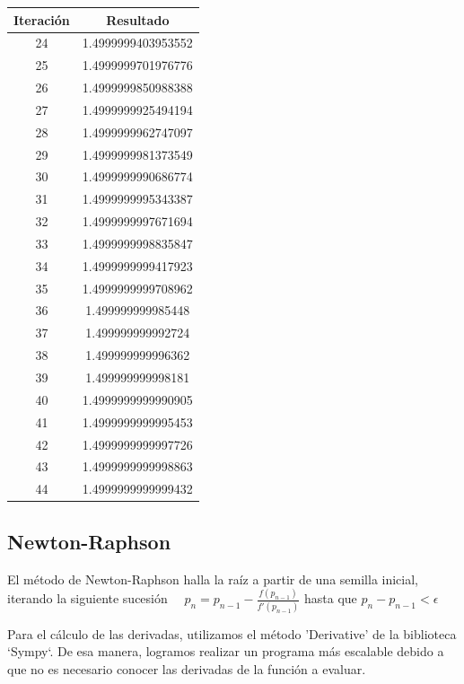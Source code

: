 \documentclass[titlepage,a4paper]{article}
\begin{document}
\begin{multicols}{2}
\begin{center}
\begin{tabular}{| c | c |}
           \hline
    \end{tabular}
\end{center}
        \begin{center}
    \begin{tabular}{| c | c |}
    \hline
     Iteración & Resultado \\ \hline
   24     &  1.4999999403953552 \\
25     &  1.4999999701976776 \\
26     &  1.4999999850988388 \\
27     &  1.4999999925494194 \\
28     &  1.4999999962747097 \\
29     &  1.4999999981373549 \\
30     &  1.4999999990686774 \\
31     &  1.4999999995343387 \\
32     &  1.4999999997671694 \\
33     &  1.4999999998835847 \\
34     &  1.4999999999417923 \\
35     &  1.4999999999708962 \\
36     &  1.499999999985448 \\
37     &  1.499999999992724 \\
38     &  1.499999999996362 \\
39     &  1.499999999998181 \\
40     &  1.4999999999990905 \\
41     &  1.4999999999995453 \\
42     &  1.4999999999997726 \\
43     &  1.4999999999998863 \\
44     &  1.4999999999999432 \\
    \hline
    \end{tabular}
\end{center}
\end{multicols}

\subsection{Newton-Raphson}\label{sec:NewtonRaphson}
El método de Newton-Raphson halla la raíz a partir de una semilla inicial, iterando la siguiente sucesión
$\quad p_{n} =p_{n-1}-\frac{f (p_{n-1})}{f'(p_{n-1})}$ hasta que 
$p_{n}-p_{n-1} < \mbox{$\epsilon$}$


Para el cálculo de las derivadas, utilizamos el método 'Derivative' de la biblioteca `Sympy`. De esa manera, logramos realizar un programa más escalable debido a que no es necesario conocer las derivadas de la función a evaluar.
\end{document}
